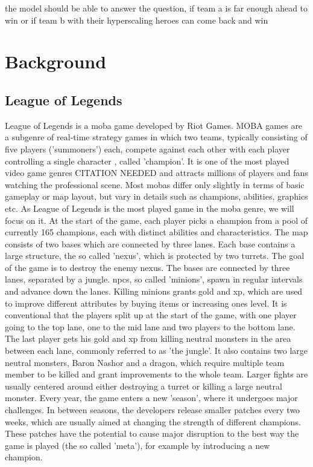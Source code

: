\documentclass[12pt, a4paper, headinclude, twoside, plainheadsepline, open=right, numbers=noenddot, hidelinks, toc=listof, toc=bibliography]{scrreprt}
\begin{document}
the model should be able to answer the question, if team a is far enough ahead to win or if team b with their hyperscaling heroes can come back and win

\chapter{Background}
\label{chap:background}

\section{League of Legends}
\label{sec:LoL}

League of Legends is a \ac{moba} game developed by Riot Games.
MOBA games are a subgenre of real-time strategy games in which two teams, typically consisting of five players ('summoners') each, compete against each other with each player controlling a single character \cite{mora-cantallopsMOBAGamesLiterature2018}, called 'champion'.
It is one of the most played video game genres CITATION NEEDED and attracts millions of players and fans watching the professional scene.
Most \acp{moba} differ only slightly in terms of basic gameplay or map layout, but vary in details such as champions, abilities, graphics etc.
As League of Legends is the most played game in the \ac{moba} genre, we will focus on it.
At the start of the game, each player picks a champion from a pool of currently 165 champions, each with distinct abilities and characteristics.
The map consists of two bases which are connected by three lanes.
Each base contains a large structure, the so called 'nexus', which is protected by two turrets. 
The goal of the game is to destroy the enemy nexus.
The bases are connected by three lanes, separated by a jungle.
\Acp{npc}, so called 'minions', spawn in regular intervals and advance down the lanes.
Killing minions grants gold and \ac{xp}, which are used to improve different attributes by buying items or increasing ones level.
It is conventional that the players split up at the start of the game, with one player going to the top lane, one to the mid lane and two players to the bottom lane.
The last player gets his gold and \ac{xp} from killing neutral monsters in the area between each lane, commonly referred to as 'the jungle'.
It also contains two large neutral monsters, Baron Nashor and a dragon, which require multiple team member to be killed and grant improvements to the whole team.
Larger fights are usually centered around either destroying a turret or killing a large neutral monster.
Every year, the game enters a new 'season', where it undergoes major challenges. 
In between seasons, the developers release smaller patches every two weeks, which are usually aimed at changing the strength of different champions.
These patches have the potential to cause major disruption to the best way the game is played (the so called 'meta'),  for example by introducing a new champion.
\end{document}
